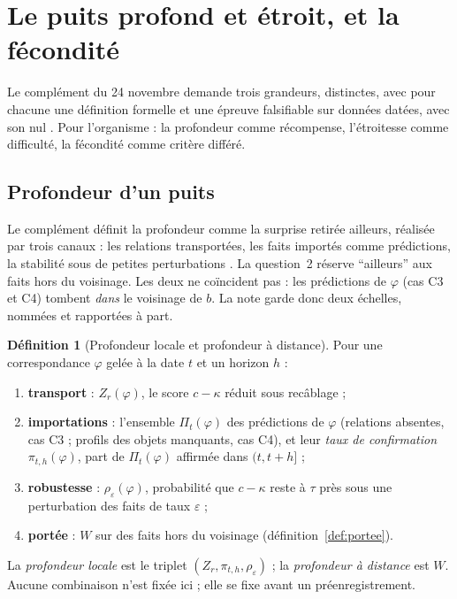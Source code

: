 \documentclass[11pt,a4paper]{article}
\theoremstyle{definition}
\newtheorem{definition}{Définition}[section]
\theoremstyle{plain}
\begin{document}
\section{Le puits profond et étroit, et la fécondité}
\label{sec:puits}

Le complément du 24 novembre demande trois grandeurs, distinctes, avec pour chacune une définition
formelle et une épreuve falsifiable sur données datées, avec son nul
\cite{complementspectral}. Pour l'organisme : la profondeur comme récompense, l'étroitesse comme
difficulté, la fécondité comme critère différé.

\subsection{Profondeur d'un puits}

Le complément définit la profondeur comme la surprise retirée ailleurs, réalisée par trois
canaux : les relations transportées, les faits importés comme prédictions, la stabilité sous de
petites perturbations \cite[point (2)]{complementspectral}. La question~2 réserve
\enquote{ailleurs} aux faits hors du voisinage. Les deux ne coïncident pas : les prédictions de
$\varphi$ (cas C3 et C4) tombent \emph{dans} le voisinage de $b$. La note garde donc deux échelles,
nommées et rapportées à part.

\begin{definition}[Profondeur locale et profondeur à distance]
\label{def:profondeur}
Pour une correspondance $\varphi$ gelée à la date $t$ et un horizon $h$ :
\begin{enumerate}
\item \textbf{transport} : $Z_r(\varphi)$, le score $c-\kappa$ réduit sous recâblage ;
\item \textbf{importations} : l'ensemble $\Pi_t(\varphi)$ des prédictions de $\varphi$ (relations
absentes, cas C3 ; profils des objets manquants, cas C4), et leur \emph{taux de confirmation}
$\pi_{t,h}(\varphi)$, part de $\Pi_t(\varphi)$ affirmée dans $(t,t+h]$ ;
\item \textbf{robustesse} : $\rho_\varepsilon(\varphi)$, probabilité que $c-\kappa$ reste à $\tau$
près sous une perturbation des faits de taux $\varepsilon$ ;
\item \textbf{portée} : $W$ sur des faits hors du voisinage (définition~\ref{def:portee}).
\end{enumerate}
La \emph{profondeur locale} est le triplet $(Z_r,\pi_{t,h},\rho_\varepsilon)$ ; la \emph{profondeur à
distance} est $W$. Aucune combinaison n'est fixée ici ; elle se fixe avant un préenregistrement.
\end{definition}
\end{document}
